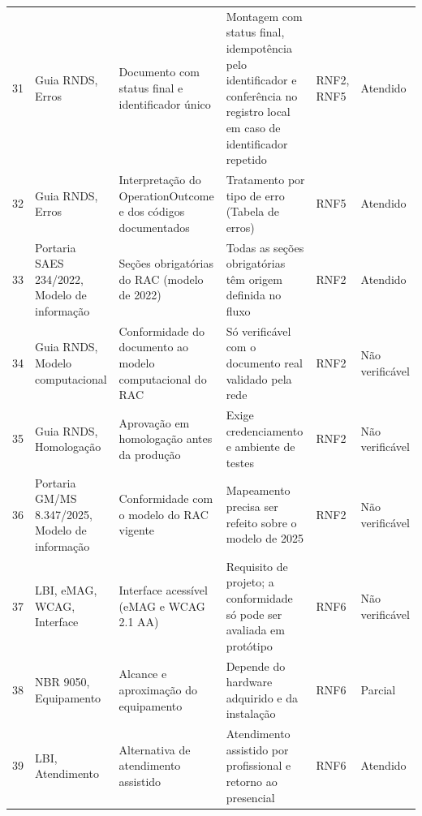 {\begin{longtable}{L{0.5cm} L{1.9cm} L{3.6cm} L{4.3cm} L{1.3cm} L{1.6cm}}
31 & Guia RNDS, Erros & Documento com status final e identificador único & Montagem com status final, idempotência pelo identificador e conferência no registro local em caso de identificador repetido & RNF2, RNF5 & Atendido \\
32 & Guia RNDS, Erros & Interpretação do OperationOutcome e dos códigos documentados & Tratamento por tipo de erro (Tabela de erros) & RNF5 & Atendido \\
33 & Portaria SAES 234/2022, Modelo de informação & Seções obrigatórias do RAC (modelo de 2022) & Todas as seções obrigatórias têm origem definida no fluxo & RNF2 & Atendido \\
34 & Guia RNDS, Modelo computacional & Conformidade do documento ao modelo computacional do RAC & Só verificável com o documento real validado pela rede & RNF2 & Não verificável \\
35 & Guia RNDS, Homologação & Aprovação em homologação antes da produção & Exige credenciamento e ambiente de testes & RNF2 & Não verificável \\
36 & Portaria GM/MS 8.347/2025, Modelo de informação & Conformidade com o modelo do RAC vigente & Mapeamento precisa ser refeito sobre o modelo de 2025 & RNF2 & Não verificável \\
37 & LBI, eMAG, WCAG, Interface & Interface acessível (eMAG e WCAG 2.1 AA) & Requisito de projeto; a conformidade só pode ser avaliada em protótipo & RNF6 & Não verificável \\
38 & NBR 9050, Equipamento & Alcance e aproximação do equipamento & Depende do hardware adquirido e da instalação & RNF6 & Parcial \\
39 & LBI, Atendimento & Alternativa de atendimento assistido & Atendimento assistido por profissional e retorno ao presencial & RNF6 & Atendido \\
\end{longtable}
}
